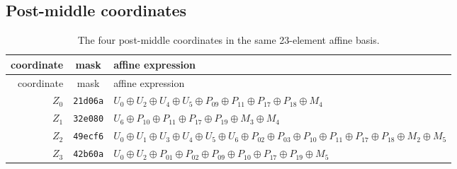 \subsection{Post-middle coordinates}
\begin{longtable}{@{}rc>{\raggedright\arraybackslash}p{}@{}}
\caption{The four post-middle coordinates in the same 23-element affine basis.}\label{tab:post-coordinates}\\
\toprule
coordinate & mask & affine expression \\
\midrule\endfirsthead
\toprule
coordinate & mask & affine expression \\
\midrule\endhead
\bottomrule\endfoot
$Z_0$ & \texttt{21d06a} & $U_0\mathbin{\oplus}\allowbreak U_2\mathbin{\oplus}\allowbreak U_4\mathbin{\oplus}\allowbreak U_5\mathbin{\oplus}\allowbreak P_{09}\mathbin{\oplus}\allowbreak P_{11}\mathbin{\oplus}\allowbreak P_{17}\mathbin{\oplus}\allowbreak P_{18}\mathbin{\oplus}\allowbreak M_4$ \\
$Z_1$ & \texttt{32e080} & $U_6\mathbin{\oplus}\allowbreak P_{10}\mathbin{\oplus}\allowbreak P_{11}\mathbin{\oplus}\allowbreak P_{17}\mathbin{\oplus}\allowbreak P_{19}\mathbin{\oplus}\allowbreak M_3\mathbin{\oplus}\allowbreak M_4$ \\
$Z_2$ & \texttt{49ecf6} & $U_0\mathbin{\oplus}\allowbreak U_1\mathbin{\oplus}\allowbreak U_3\mathbin{\oplus}\allowbreak U_4\mathbin{\oplus}\allowbreak U_5\mathbin{\oplus}\allowbreak U_6\mathbin{\oplus}\allowbreak P_{02}\mathbin{\oplus}\allowbreak P_{03}\mathbin{\oplus}\allowbreak P_{10}\mathbin{\oplus}\allowbreak P_{11}\mathbin{\oplus}\allowbreak P_{17}\mathbin{\oplus}\allowbreak P_{18}\mathbin{\oplus}\allowbreak M_2\mathbin{\oplus}\allowbreak M_5$ \\
$Z_3$ & \texttt{42b60a} & $U_0\mathbin{\oplus}\allowbreak U_2\mathbin{\oplus}\allowbreak P_{01}\mathbin{\oplus}\allowbreak P_{02}\mathbin{\oplus}\allowbreak P_{09}\mathbin{\oplus}\allowbreak P_{10}\mathbin{\oplus}\allowbreak P_{17}\mathbin{\oplus}\allowbreak P_{19}\mathbin{\oplus}\allowbreak M_5$ \\
\end{longtable}

